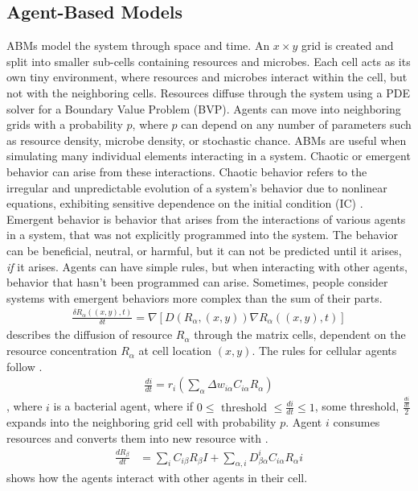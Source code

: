 \subsection{Agent-Based Models}
ABMs model the system through space and time.
An $x \times y$ grid is created and split into smaller sub-cells containing resources and microbes.
Each cell acts as its own tiny environment, where resources and microbes interact within the cell, but not with the neighboring cells.
Resources diffuse through the system using a PDE solver for a Boundary Value Problem (BVP).
Agents can move into neighboring grids with a probability $p$, where $p$ can depend on any number of parameters such as resource density, microbe density, or stochastic chance. \newline 
ABMs are useful when simulating many individual elements interacting in a system.
Chaotic or emergent behavior can arise from these interactions.
Chaotic behavior refers to the irregular and unpredictable evolution of a system's behavior due to nonlinear equations, exhibiting sensitive dependence on the initial condition (IC) \cite{encyclopedia_of_physical_science_and_technology}. \newline 
Emergent behavior is behavior that arises from the interactions of various agents in a system, that was not explicitly programmed into the system.
The behavior can be beneficial, neutral, or harmful, but it can not be predicted until it arises, \textit{if} it arises.
Agents can have simple rules, but when interacting with other agents, behavior that hasn't been programmed can arise.
Sometimes, people consider systems with emergent behaviors more complex than the sum of their parts. \newline
\begin{align} 
    \label{eq:resource_diffusion}
    \frac{\delta R_\alpha(\left(x, y\right), t)}{\delta t} = \nabla \left[D \left( R_\alpha, \left(x, y\right) \right) \nabla R_\alpha \left(\left(x, y\right), t \right) \right]
\end{align}
 describes the diffusion of resource $R_\alpha$ through the matrix cells, dependent on the resource concentration $R_\alpha$ at cell location $(x, y)$. 
The rules for cellular agents follow . 
\begin{align} 
    \label{eq:agent_rules}
    \frac{di}{dt} = r_i \left( \sum_\alpha \Delta w_{i\alpha}C_{i\alpha}R_\alpha\right)
\end{align}, 
where $i$ is a bacterial agent, where if $0 \leq \text{ threshold } \leq \frac{di}{dt} \leq 1$, some threshold, $\frac{\frac{di}{dt}}{2}$ expands into the neighboring grid cell with probability $p$. 
Agent $i$ consumes resources and converts them into new resource with . 
\begin{align} 
    \label{eq:agent_consumption_and_conversion}
    \frac{dR_\beta}{dt} &= \sum_i C_{i\beta}R_\beta I + \sum_{\alpha, i}D_{\beta \alpha}^{i} C_{i \alpha} R_\alpha i
\end{align}
 shows how the agents interact with other agents in their cell. 

